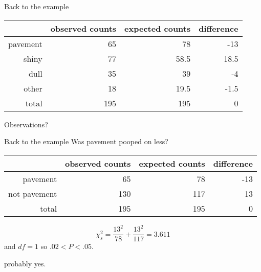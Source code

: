 \begin{frame}{Back to the example}
    \begin{center}
        \begin{tabular}{rrrr}
            & observed counts & expected counts & difference \\
            \hline 
            pavement & 65 & 78 & -13 \\
            shiny & 77 & 58.5 & 18.5 \\
            dull & 35 & 39 & -4 \\
            other & 18 & 19.5 & -1.5 \\
            \hline
            total & 195 & 195  & 0 \\
        \end{tabular}
    \end{center}

    \vspace{2em}

    Observations?
\end{frame}


\begin{frame}{Back to the example}
    Was pavement pooped on less?
    \begin{center}
        \begin{tabular}{rrrr}
            & observed counts & expected counts & difference \\
            \hline 
            pavement & 65 & 78 & -13 \\
            not pavement & 130 & 117 & 13 \\
            \hline
            total & 195 & 195  & 0 
        \end{tabular}
    \end{center}

    \vspace{2em}
    
    \[ \chi^2_s = \frac{ 13^2 }{ 78 } + \frac{ 13^2 }{ 117 } = 3.611 \]
    and $df=1$ so $.02<P<.05$.

    \vspace{2em}

     probably yes.


\end{frame}

